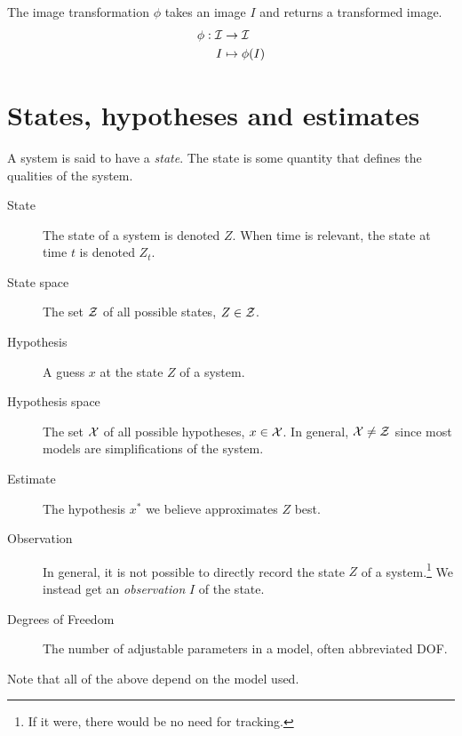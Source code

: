 \begin{definition}
\label{def:image_transform}
  The image transformation $\phi$ takes an image $I$ and returns a
  transformed image.
  \begin{equation}
    \begin{split}
      \phi : \mathcal{I} &\rightarrow \mathcal{I}\\
      I &\mapsto \phi(I)
    \end{split}
  \end{equation}
\end{definition}

\section{States, hypotheses and estimates}
A system is said to have a \emph{state}. The state is some quantity
that defines the qualities of the system.

\begin{description}
\item[State] The state of a system is denoted $Z$. When time is
  relevant, the state at time $t$ is denoted $Z_t$.
\item[State space] The set $\mathcal{Z}$ of all possible states, $Z \in \mathcal{Z}$.
\item[Hypothesis] A guess $x$ at the state $Z$ of a system.
\item[Hypothesis space] The set $\mathcal{X}$ of all possible hypotheses, $x
  \in \mathcal{X}$. In general, $\mathcal{X} \neq \mathcal{Z}$ since most models are
  simplifications of the system.
\item[Estimate] The hypothesis $x^*$ we believe approximates $Z$ best.
\item[Observation] In general, it is not possible to directly record
  the state $Z$ of a system.\footnote{If it were, there would be no
    need for tracking.} We instead get an \emph{observation} $I$ of
  the state.
\item[Degrees of Freedom] The number of adjustable parameters in a
  model, often abbreviated DOF.
\end{description}

Note that all of the above depend on the  model used.
